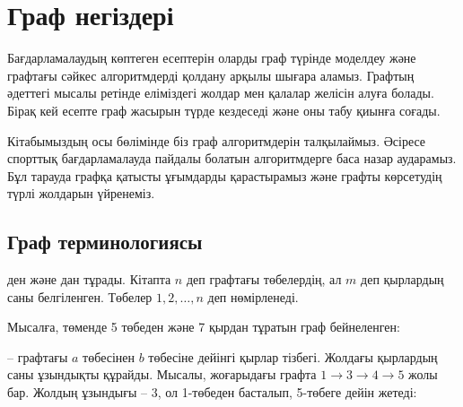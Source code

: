 \chapter{Граф негіздері}

Бағдарламалаудың көптеген есептерін оларды граф түрінде моделдеу және графтағы сәйкес алгоритмдерді қолдану
арқылы шығара аламыз. Графтың әдеттегі мысалы ретінде еліміздегі жолдар мен қалалар желісін алуға болады. Бірақ кей есепте граф жасырын түрде кездеседі және оны табу қиынға соғады.  

Кітабымыздың осы бөлімінде біз граф алгоритмдерін талқылаймыз.
Әсіресе спорттық бағдарламалауда пайдалы болатын
алгоритмдерге баса назар аударамыз. Бұл тарауда графқа
қатысты ұғымдарды қарастырамыз және графты көрсетудің түрлі жолдарын үйренеміз.

\section{Граф терминологиясы}


 ден және дан тұрады. Кітапта $n$ деп графтағы төбелердің,
ал $m$ деп қырлардың саны белгіленген. Төбелер $1,2,\ldots,n$ деп нөмірленеді.

Мысалға, төменде 5 төбеден және 7 қырдан тұратын граф бейнеленген:

\begin{center}
\end{center}


 -- графтағы $a$ төбесінен $b$ төбесіне дейінгі  қырлар тізбегі.
Жолдағы қырлардың саны ұзындықты құрайды.
Мысалы, жоғарыдағы графта
 $1 \rightarrow 3 \rightarrow 4 \rightarrow 5$ жолы бар. 
 Жолдың ұзындығы -- 3, ол 1-төбеден басталып, 5-төбеге дейін жетеді:


